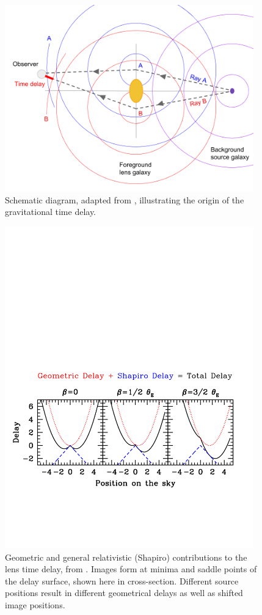 \begin{figure}[!t]
\centering\includegraphics[width=0.96\textwidth]{figures/wavefront-schematic.png}
\caption{Schematic diagram, adapted from \citep{T+E15},
illustrating the origin of the gravitational time delay.}
\label{fig:timedelaycartoon}
\end{figure}

\begin{figure}[!ht]
\centering\includegraphics[width=0.96\textwidth]{figures/delays.pdf}
\caption{Geometric and general relativistic (Shapiro) contributions
to the lens time delay, from \citep{T+E15}. Images form
at minima and saddle points of the delay surface, shown here in
cross-section. Different source positions result in different
geometrical delays as well as shifted image positions.}
\label{fig:delays}
\end{figure}

